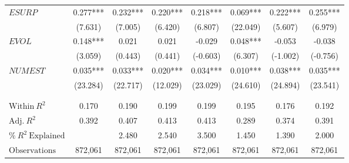 \begin{xltabular}{\linewidth}{X * {7}{S[table-format=4.3]}}
$ESURP$ & 0.277*** & 0.232*** & 0.220*** & 0.218*** & 0.069*** & 0.222*** & 0.255***\\
 & (7.631) & (7.005) & (6.420) & (6.807) & (22.049) & (5.607) & (6.979)\\
$EVOL$ & 0.148*** & 0.021 & 0.021 & -0.029 & 0.048*** & -0.053 & -0.038\\
\addlinespace
 & (3.059) & (0.443) & (0.441) & (-0.603) & (6.307) & (-1.002) & (-0.756)\\
$NUMEST$ & 0.035*** & 0.033*** & 0.020*** & 0.034*** & 0.010*** & 0.038*** & 0.035***\\
 & (23.284) & (22.717) & (12.029) & (23.029) & (24.610) & (24.894) & (23.541)\\
 &  &  &  &  &  &  \vphantom{1} & \\
\midrule
 &  &  &  &  &  &  & \\
\addlinespace
$\textrm{Within} \: R^2$ & {0.170} & {0.190} & {0.199} & {0.199} & {0.195} & {0.176} & {0.192}\\
$\textrm{Adj.} \: R^2$ & {0.392} & {0.407} & {0.413} & {0.413} & {0.289} & {0.374} & {0.391}\\
$\% \: R^2 \: \textrm{Explained}$ & {} & {2.480} & {2.540} & {3.500} & {1.450} & {1.390} & {2.000}\\
$\textrm{Observations}$ & {872,061} & {872,061} & {872,061} & {872,061} & {872,061} & {872,061} & {872,061}\\*
\end{xltabular}



